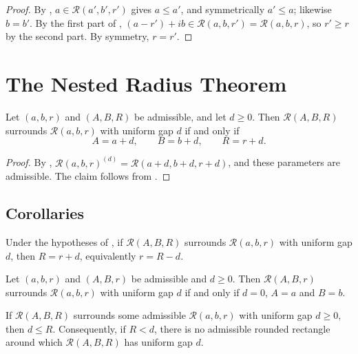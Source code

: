 \documentclass[a4paper,UKenglish,cleveref,autoref,thm-restate]{lipics-v2021}
\newcommand{\RR}{\mathcal{R}}
\begin{document}
\begin{proof}
By , $a \in \RR(a', b', r')$ gives $a \le a'$, and symmetrically $a' \le a$;
likewise $b = b'$. By the first part of ,
$(a - r') + ib \in \RR(a, b, r') = \RR(a, b, r)$, so $r' \ge r$ by the second part. By symmetry,
$r = r'$.
\end{proof}

\section{The Nested Radius Theorem}\label{sec:main}

\begin{theorem}\label{thm:main}
Let $(a, b, r)$ and $(A, B, R)$ be admissible, and let $d \ge 0$. Then $\RR(A, B, R)$ surrounds
$\RR(a, b, r)$ with uniform gap $d$ if and only if
\[
  A = a + d, \qquad B = b + d, \qquad R = r + d .
\]
\end{theorem}

\begin{proof}
By , $\RR(a, b, r)^{(d)} = \RR(a + d, b + d, r + d)$, and these parameters are
admissible. The claim follows from .
\end{proof}

\subsection{Corollaries}\label{sec:corollaries}

\begin{corollary}\label{cor:laws}
Under the hypotheses of , if $\RR(A, B, R)$ surrounds $\RR(a, b, r)$ with uniform
gap $d$, then $R = r + d$, equivalently $r = R - d$.
\end{corollary}

\begin{corollary}\label{cor:equal}
Let $(a, b, r)$ and $(A, B, r)$ be admissible and $d \ge 0$. Then $\RR(A, B, r)$ surrounds
$\RR(a, b, r)$ with uniform gap $d$ if and only if $d = 0$, $A = a$ and $B = b$.
\end{corollary}

\begin{corollary}\label{cor:clamp}
If $\RR(A, B, R)$ surrounds some admissible $\RR(a, b, r)$ with uniform gap $d \ge 0$, then
$d \le R$. Consequently, if $R < d$, there is no admissible rounded rectangle around which
$\RR(A, B, R)$ has uniform gap $d$.
\end{corollary}
\end{document}
